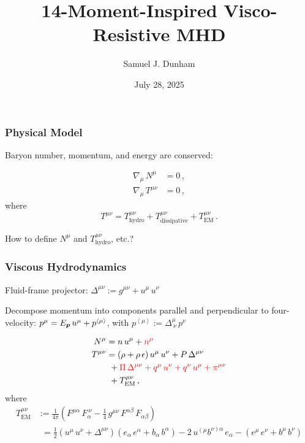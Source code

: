 \documentclass{beamer}
\title[SXS Group Meeting]{14-Moment-Inspired Visco-Resistive MHD}
\author{Samuel J. Dunham}
\date{July 28, 2025}
\begin{document}
\begin{frame}

  \maketitle

\end{frame}

\begin{frame}
\frametitle{Physical Model}

  Baryon number, momentum, and energy are conserved:

  \begin{align}
    \nabla_{\mu} \, N^{\mu} &= 0 \, , \\
    \nabla_{\mu} \, T^{\mu\nu} &= 0 \, ,
  \end{align}
  where
  \begin{equation}
    T^{\mu\nu} = T^{\mu\nu}_{\mathrm{hydro}}
    + T^{\mu\nu}_{\mathrm{dissipative}} + T^{\mu\nu}_{\mathrm{EM}} \, .
  \end{equation}

  How to define $N^{\mu}$ and $T^{\mu\nu}_{\mathrm{hydro}}$, etc.?

\end{frame}

\begin{frame}
\frametitle{Viscous Hydrodynamics}

  Fluid-frame projector: $\Delta^{\mu\nu} := g^{\mu\nu} + u^{\mu} \, u^{\nu}$ \newline

  Decompose momentum into components parallel and perpendicular to four-velocity:
  $p^{\mu} = E_{\boldsymbol{p}} \, u^{\mu} + p^{\left<\mu\right>}$, with
  $p^{\left<\mu\right>} := \Delta^{\mu}_{~\nu} \, p^{\nu}$

  \begin{align}
    N^{\mu} &= n \, u^{\mu} + \textcolor{red}{n^{\mu}} \\
    T^{\mu\nu} &= \left( \rho + \rho \, \epsilon \right)
    u^{\mu} \, u^{\nu} + P \, \Delta^{\mu\nu} \notag \\
    &\ + \textcolor{red}{\Pi \, \Delta^{\mu\nu}
    + q^{\mu} \, u^{\nu} + q^{\nu} \, u^{\mu} + \pi^{\mu\nu}} \notag \\
    &\ + T^{\mu\nu}_{\mathrm{EM}} \, ,
  \end{align}
  where
  \begin{align}
    T^{\mu\nu}_{\mathrm{EM}}
    &:= \frac{1}{4\pi} \left( F^{\mu\alpha} \, F_{\alpha}^{~\nu}
    - \frac{1}{4} \, g^{\mu\nu} \, F^{\alpha\beta} \, F_{\alpha\beta} \right) \\
    &\phantom{:}= \frac{1}{2} \left( u^{\mu} \, u^{\nu} + \Delta^{\mu\nu} \right)
    \left( e_{\alpha} \, e^{\alpha} + b_{\alpha} \, b^{\alpha} \right)
    - 2 \, u^{\left(\mu\right.}b^{\left.\nu\right)\alpha} \, e_{\alpha}
    - \left( e^{\mu} \, e^{\nu} + b^{\mu} \, b^{\nu} \right)
  \end{align}

\end{frame}
\end{document}
